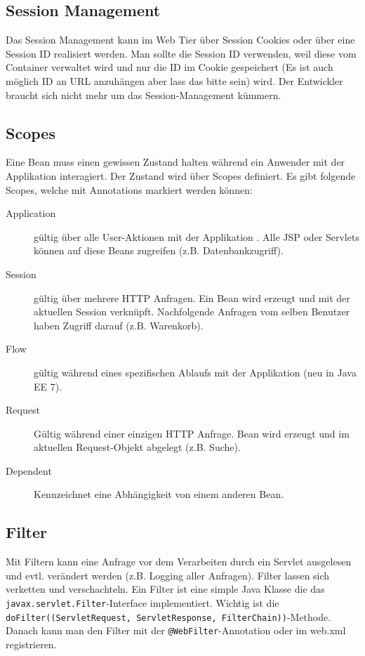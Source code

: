 \subsection{Session Management}

Das Session Management kann im Web Tier über Session Cookies oder über eine Session ID realisiert werden. Man sollte die Session ID verwenden, weil diese vom Container verwaltet wird und nur die ID im Cookie gespeichert (Es ist auch möglich ID an URL anzuhängen aber lass das bitte sein) wird. Der Entwickler braucht sich nicht mehr um das Session-Management kümmern.

\subsection{Scopes}
\label{sec:scope}

Eine Bean muss einen gewissen Zustand halten während ein Anwender mit der Applikation interagiert. Der Zustand wird über Scopes definiert. Es gibt folgende Scopes, welche mit Annotations markiert werden können:
\begin{description}
	\item[Application] gültig über alle User-Aktionen mit der Applikation . Alle JSP oder Servlets können auf diese Beans zugreifen (z.B. Datenbankzugriff).
	\item[Session] gültig über mehrere HTTP Anfragen. Ein Bean wird erzeugt und mit der aktuellen Session verknüpft. Nachfolgende Anfragen vom selben Benutzer haben Zugriff darauf (z.B. Warenkorb).
	\item[Flow] gültig während eines spezifischen Ablaufs mit der Applikation (neu in Java EE 7). 
	\item[Request] Gültig während einer einzigen HTTP Anfrage. Bean wird erzeugt und im aktuellen Request-Objekt abgelegt (z.B. Suche).
	\item[Dependent] Kennzeichnet eine Abhängigkeit von einem anderen Bean.
\end{description}

\subsection{Filter}

Mit Filtern kann eine Anfrage vor dem Verarbeiten durch ein Servlet ausgelesen und evtl. verändert werden (z.B. Logging aller Anfragen). Filter lassen sich verketten und verschachteln. Ein Filter ist eine simple Java Klasse die das \verb|javax.servlet.Filter|-Interface implementiert. Wichtig ist die \verb|doFilter((ServletRequest, ServletResponse, FilterChain))|-Methode. Danach kann man den Filter mit der \verb|@WebFilter|-Annotation oder im web.xml registrieren.

